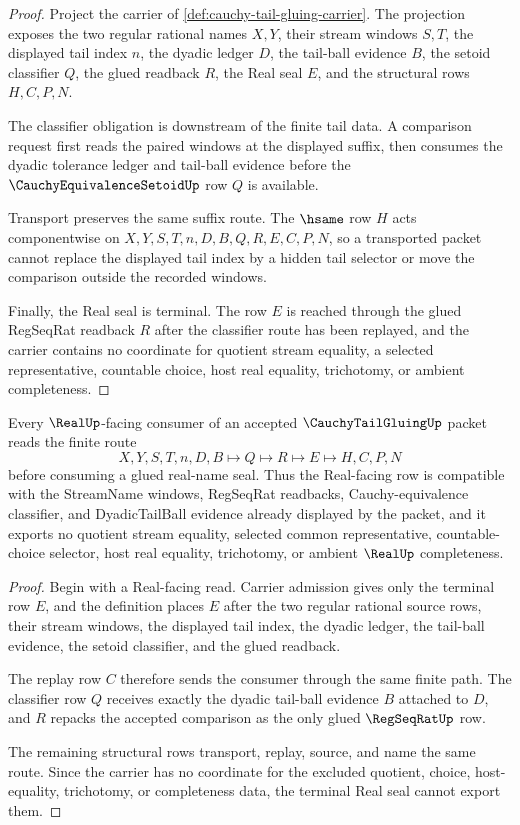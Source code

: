 \begin{proof}
Project the carrier of \autoref{def:cauchy-tail-gluing-carrier}. The projection exposes the two regular rational names $X,Y$, their stream windows $S,T$, the displayed tail index $n$, the dyadic ledger $D$, the tail-ball evidence $B$, the setoid classifier $Q$, the glued readback $R$, the Real seal $E$, and the structural rows $H,C,P,N$.

The classifier obligation is downstream of the finite tail data. A comparison request first reads the paired windows at the displayed suffix, then consumes the dyadic tolerance ledger and tail-ball evidence before the $\CauchyEquivalenceSetoidUp$ row $Q$ is available.

Transport preserves the same suffix route. The $\hsame$ row $H$ acts componentwise on $X,Y,S,T,n,D,B,Q,R,E,C,P,N$, so a transported packet cannot replace the displayed tail index by a hidden tail selector or move the comparison outside the recorded windows.

Finally, the Real seal is terminal. The row $E$ is reached through the glued RegSeqRat readback $R$ after the classifier route has been replayed, and the carrier contains no coordinate for quotient stream equality, a selected representative, countable choice, host real equality, trichotomy, or ambient completeness.
\end{proof}

\begin{theorem}\label{thm:cauchy-tail-gluing-real-seal-route}
Every $\RealUp$-facing consumer of an accepted $\CauchyTailGluingUp$ packet reads the finite route
$$
X,Y,S,T,n,D,B \longmapsto Q \longmapsto R \longmapsto E \longmapsto H,C,P,N
$$
before consuming a glued real-name seal. Thus the Real-facing row is compatible with the StreamName windows, RegSeqRat readbacks, Cauchy-equivalence classifier, and DyadicTailBall evidence already displayed by the packet, and it exports no quotient stream equality, selected common representative, countable-choice selector, host real equality, trichotomy, or ambient $\RealUp$ completeness.
\end{theorem}
\begin{proof}
Begin with a Real-facing read. Carrier admission gives only the terminal row $E$, and the definition places $E$ after the two regular rational source rows, their stream windows, the displayed tail index, the dyadic ledger, the tail-ball evidence, the setoid classifier, and the glued readback.

The replay row $C$ therefore sends the consumer through the same finite path. The classifier row $Q$ receives exactly the dyadic tail-ball evidence $B$ attached to $D$, and $R$ repacks the accepted comparison as the only glued $\RegSeqRatUp$ row.

The remaining structural rows transport, replay, source, and name the same route. Since the carrier has no coordinate for the excluded quotient, choice, host-equality, trichotomy, or completeness data, the terminal Real seal cannot export them.
\end{proof}


